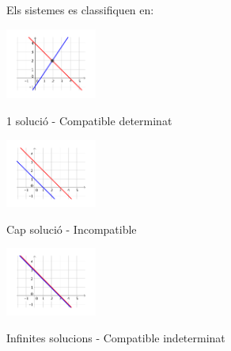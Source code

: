 \begin{theorybox}
	Els sistemes es classifiquen en:
	
	\begin{multicols}{3}
	\centering
		\includegraphics[width=3cm]{img-06/scd}
		
		1 solució - Compatible determinat
		
		\includegraphics[width=3cm]{img-06/si}
		
		Cap solució - Incompatible
		
		\includegraphics[width=3cm]{img-06/sci}
		
		Infinites solucions - Compatible indeterminat
	\end{multicols}
\end{theorybox}	
 
\newpage 

